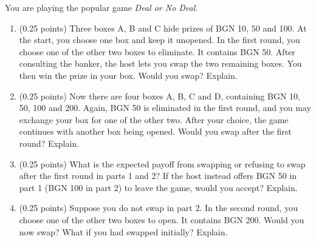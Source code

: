 \documentclass[a4paper]{report}
\begin{document}
\begin{problem}
    You are playing the popular game \emph{Deal or No Deal}.
    \begin{enumerate}
        \item (0.25 points) Three boxes A, B and C hide prizes of BGN 10, 50 and 100. At the start, you choose one box and keep it unopened. In the first round, you choose one of the other two boxes to eliminate. It contains BGN 50. After consulting the banker, the host lets you swap the two remaining boxes. You then win the prize in your box. Would you swap? Explain.
        \item (0.25 points) Now there are four boxes A, B, C and D, containing BGN 10, 50, 100 and 200. Again, BGN 50 is eliminated in the first round, and you may exchange your box for one of the other two. After your choice, the game continues with another box being opened. Would you swap after the first round? Explain.
        \item (0.25 points) What is the expected payoff from swapping or refusing to swap after the first round in parts 1 and 2? If the host instead offers BGN 50 in part 1 (BGN 100 in part 2) to leave the game, would you accept? Explain.
        \item (0.25 points) Suppose you do not swap in part 2. In the second round, you choose one of the other two boxes to open. It contains BGN 200. Would you now swap? What if you had swapped initially? Explain.
    \end{enumerate}
\end{problem}
\end{document}
